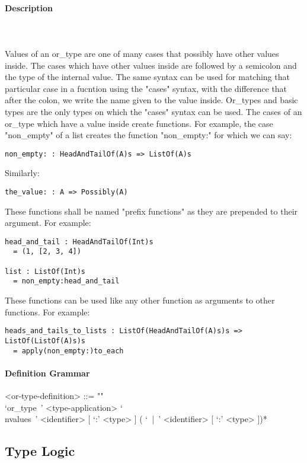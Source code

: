 \documentclass{article}
\def\pend{\mbox{} \\\\}
\begin{document}
\paragraph{Description}\pend
Values of an or\_type are one of many cases that possibly have other values inside.
The cases which have other values inside are followed by a semicolon and the 
type of the internal value. The same syntax can be used for matching that particular 
case in a fucntion using the "cases" syntax, with the difference that after the
colon, we write the name given to the value inside. 
Or\_types and basic types are the only types on which
the "cases" syntax can be used. The cases of an or\_type which have a value
inside create functions. For example, the case "non\_empty" of a list creates the
function "non\_empty:" for which we can say:
\begin{verbatim}
non_empty: : HeadAndTailOf(A)s => ListOf(A)s
\end{verbatim}
Similarly:
\begin{verbatim}
the_value: : A => Possibly(A)
\end{verbatim}
These functions shall be named "prefix functions" as they are prepended to their
argument.
For example:
\begin{verbatim}
head_and_tail : HeadAndTailOf(Int)s
  = (1, [2, 3, 4])

list : ListOf(Int)s
  = non_empty:head_and_tail
\end{verbatim}
These functions can be used like any other function as arguments to other functions.
For example:
\begin{verbatim}
heads_and_tails_to_lists : ListOf(HeadAndTailOf(A)s)s => ListOf(ListOf(A)s)s
  = apply(non_empty:)to_each
\end{verbatim}

\paragraph{Definition Grammar}
\begin{grammar}
<or-type-definition> ::= ""\\
`or_type\ ' <type-application> 
`\\nvalues\ ' <identifier> [ `:' <type> ] ( `\ |\ ' <identifier> [ `:' <type> ])*
\end{grammar}

\subsection{Type Logic}
\label{subsec:typelogic}
\end{document}
